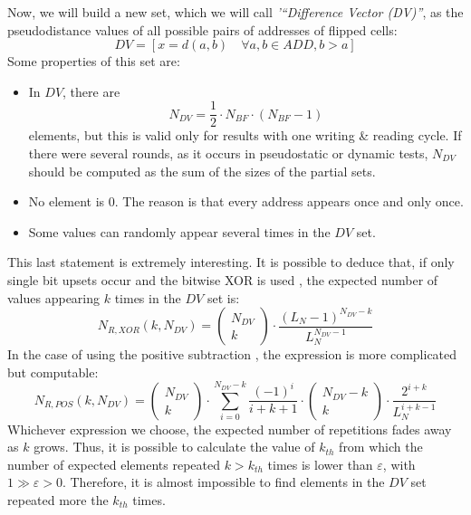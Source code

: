 Now, we will build a new set, which we will call \textit{'``Difference Vector (DV)''}, as the pseudodistance values of all possible pairs of addresses of flipped cells:
%
\begin{equation}
	DV = \left[x = d(a, b) \quad \forall a, b \in ADD, b>a\right]
	\label{Eq:DefinitionOfDV}
\end{equation}
%
Some properties of this set are:
%
\begin{itemize}
	\item In \(DV\), there are \begin{equation}N_{DV}=\frac{1}{2}\cdot N_{BF}\cdot \left(N_{BF}-1\right) \label{Eq:SizeOfDV}\end{equation} elements, but this is valid only for results with one writing \& reading cycle. If there were several rounds, as it occurs in pseudostatic or dynamic tests, \(N_{DV}\) should be computed as the sum of the sizes of the partial sets.
	\item No element is \(0\). The reason is that every address appears once and only once.
	\item Some values can randomly appear several times in the \(DV\) set.
\end{itemize}
%
This last statement is extremely interesting. It is possible to deduce that, if only single bit upsets occur and the bitwise XOR is used \cite{Franco2017}, the expected number of values appearing \(k\) times in the \(DV\) set is:
\[
	N_{R,XOR}\left(k, N_{DV}\right) = \left( \begin{matrix} N_{DV}\\ k \end{matrix} \right) \cdot \frac{\left(L_N -1\right)^{N_{DV}-k}}{L_N^{N_{DV}-1}}
\]
In the case of using the positive subtraction \cite{Fabero2020}, the expression is more complicated but computable:
\[
	N_{R,POS}\left(k, N_{DV}\right) =\left( \begin{matrix} N_{DV}\\ k \end{matrix} \right) \cdot \sum_{i=0}^{N_{DV}-k}{\frac{(-1)^i}{i+k+1} \cdot \left( \begin{matrix} N_{DV}-k\\ k \end{matrix} \right) \cdot \frac{2^{i+k}}{L_N^{i+k-1}}}
\]
Whichever expression we choose, the expected number of repetitions fades away as \(k\) grows. Thus, it is possible to calculate the value of \(k_{th}\) from which the number of expected elements repeated \(k > k_{th}\) times is lower than \(\varepsilon\), with \(1\gg \varepsilon > 0\). Therefore, it is almost impossible to find elements in the \(DV\) set repeated more the \(k_{th}\) times. 

